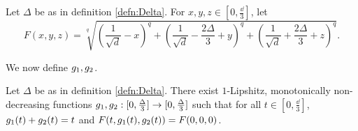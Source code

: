 \begin{defn}\label{defn:F_the_function}
Let $\Delta$ be as in definition \ref{defn:Delta}. For $x, y, z \in [0, \frac{\dd}{3}]$, let $$F(x, y, z) = \sqrt[q]{\left(\frac{1}{\sqrt{d}} - x\right)^q + \left(\frac{1}{\sqrt{d}} - \frac{2\Delta}{3} + y\right)^q + \left(\frac{1}{\sqrt{d}} + \frac{2\Delta}{3} + z\right)^q}.$$
\end{defn}

We now define $g_1, g_2$.
\begin{cor}\label{cor:lipschitz_maps}
Let $\Delta$ be as in definition \ref{defn:Delta}. There exist $1$-Lipshitz, monotonically non-decreasing functions $g_1, g_2: [0, \frac{\Delta}{3}] \to [0, \frac{\Delta}{3}]$ such that for all $t \in [0, \frac{\dd}{3}]$, $g_1(t) + g_2(t) = t$ and $F(t, g_1(t), g_2(t)) = F(0, 0, 0)$. 
\end{cor}
